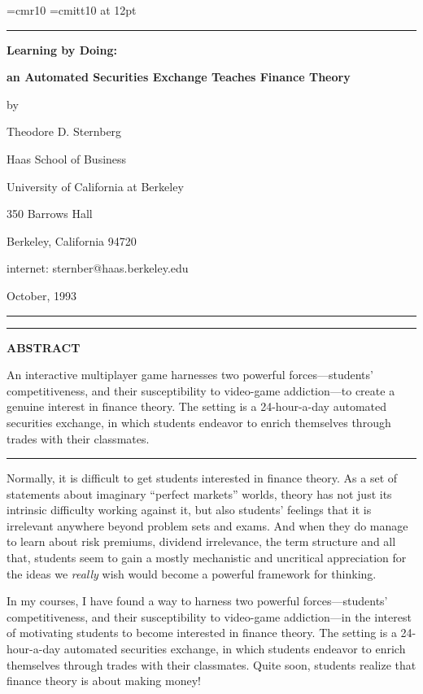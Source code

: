 
\font\katan=cmr10 
\font\tti=cmitt10 at 12pt 
{\baselineskip=12pt 
\nopagenumbers 
\hrule height 0in 
\vfil 
\centerline{{\bf Learning by Doing:}} 
\centerline{{\bf an Automated Securities Exchange Teaches Finance Theory}} 
\bigskip 
\centerline{by} 
\bigskip 
\centerline{Theodore D. Sternberg} 
\centerline{Haas School of Business} 
\centerline{University of California at Berkeley} 
\centerline{350 Barrows Hall} 
\centerline{Berkeley, California 94720} 
\centerline{internet: sternber@haas.berkeley.edu} 
\bigskip 
\centerline{October, 1993} 
\vfil\vfil 
\hrule height 0in 
\vfil 
\hrule 
\bigskip 
\centerline{{\bf ABSTRACT}} 
\medskip 
\noindent 
An interactive multiplayer game harnesses two powerful 
forces---students' competitiveness, and their susceptibility to 
video-game addiction---to create a genuine interest in 
finance theory.  The setting is a 24-hour-a-day 
automated securities exchange, in which students endeavor to enrich 
themselves through trades with their classmates. 
\bigskip\hrule 
\vfil\vfil\eject 
} 
 
 
\footline{\hfil} 
\noindent 
Normally, it is difficult to get students interested in finance 
theory.  As a set of statements about imaginary ``perfect markets'' 
worlds, theory has not just its intrinsic difficulty working against 
it, but also students' feelings that it is irrelevant anywhere beyond 
problem sets and exams.  And when they do manage to learn about risk 
premiums, dividend irrelevance, the term structure and all that, 
students seem to gain a mostly mechanistic and uncritical 
appreciation for the ideas we {\it really} wish would become a 
powerful framework for thinking. 
 
In my courses, I have found a way to harness two powerful 
forces---students' competitiveness, and their susceptibility to 
video-game addiction---in the interest of motivating students to 
become interested in finance theory.  The setting is a 24-hour-a-day 
automated securities exchange, in which students endeavor to enrich 
themselves through trades with their classmates.  Quite soon, 
students realize that finance theory is about making money!%
 
